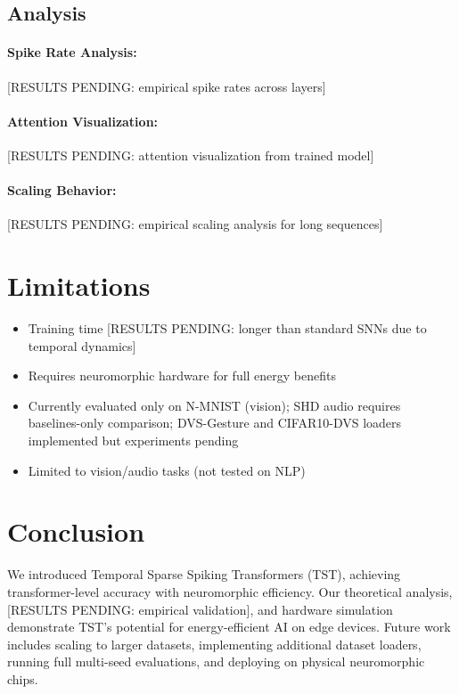 \documentclass{article}
\begin{document}
\subsection{Analysis}

\paragraph{Spike Rate Analysis:}
[RESULTS PENDING: empirical spike rates across layers]

\paragraph{Attention Visualization:}
[RESULTS PENDING: attention visualization from trained model]

\paragraph{Scaling Behavior:}
[RESULTS PENDING: empirical scaling analysis for long sequences]

\section{Limitations}

\begin{itemize}
    \item Training time [RESULTS PENDING: longer than standard SNNs due to temporal dynamics]
    \item Requires neuromorphic hardware for full energy benefits
    \item Currently evaluated only on N-MNIST (vision); SHD audio requires baselines-only comparison; DVS-Gesture and CIFAR10-DVS loaders implemented but experiments pending
    \item Limited to vision/audio tasks (not tested on NLP)
\end{itemize}

\section{Conclusion}

We introduced Temporal Sparse Spiking Transformers (TST), achieving transformer-level accuracy with neuromorphic efficiency. Our theoretical analysis, [RESULTS PENDING: empirical validation], and hardware simulation demonstrate TST's potential for energy-efficient AI on edge devices. Future work includes scaling to larger datasets, implementing additional dataset loaders, running full multi-seed evaluations, and deploying on physical neuromorphic chips.
\end{document}
